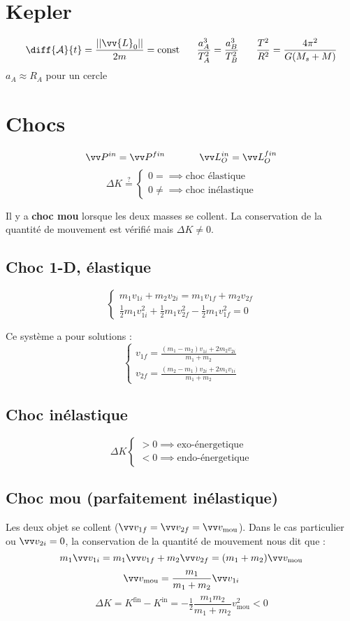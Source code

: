 \documentclass[../main.tex]{subfiles}
\begin{document}
\section{Kepler}
\[
  \diff{\mathcal{A}}{t}=\frac{||\vv{L}_0||}{2m}=\text{const} \phantom{text} \frac{a_A^3}{T_A^2}=\frac{a_B^3}{T_B^2}\phantom{text} \frac{T^2}{R^2}=\frac{4 \pi^2}{G(M_s + M)}
\]
\(a_A\approx R_A\) pour un cercle
\section{Chocs}
\[
  \Qm^{in}=\Qm^{fin} \phantom{texttext}
  \mc^{in}_O=\mc^{fin}_O
\]
\[ \Delta K \overset{?}{=}
  \begin{cases}
    0 = \implies \text{choc élastique}\\
    0 \neq \implies \text{choc inélastique}
  \end{cases}
\]

Il y a \textbf{choc mou} lorsque les deux masses se collent. La conservation de la quantité de mouvement est vérifié mais \(\Delta K \neq 0\).

\subsection{Choc 1-D, élastique}
\[
  \begin{cases}
    m_1 v_{1i} + m_2v_{2i} = m_1 v_{1f} + m_2 v_{2f} \\ 
    \tfrac{1}{2}m_1 v_{1i}^2 + \tfrac{1}{2}m_1 v_{2f}^2 - \tfrac{1}{2}m_1 v_{1f}^2 = 0
  \end{cases}
\]

Ce système a pour solutions :
\[
  \begin{cases}
    v_{1f} = \frac{(m_1-m_2)v_{1i} + 2m_2v_{2i}}{m_1+m_2} \\
    v_{2f} = \frac{(m_2-m_1)v_{2i} + 2m_1v_{1i}}{m_1+m_2}
  \end{cases}
\]

\subsection{Choc inélastique}
\[
  \Delta K 
  \begin{cases}
    > 0 \implies \text{exo-énergetique} \\
    < 0 \implies \text{endo-énergetique}
  \end{cases}
\]

\subsection{Choc mou (parfaitement inélastique)}
Les deux objet se collent (\(\vi_{1f}=\vi_{2f}=\vi_{\text{mou}}\)). Dans le cas particulier ou \(\vi_{2i}=0\), la conservation de la quantité de mouvement nous dit que : 
\[
  m_1\vi_{1i} = m_1\vi_{1f} + m_2\vi_{2f} = (m_1 + m_2)\vi_{\text{mou}} 
\]
\[
  \vi_{\text{mou}} = \frac{m_1}{m_1 + m_2}\vi_{1i}
\]
\[
  \Delta K = K^{\text{fin}} - K^{\text{in}}= -\tfrac{1}{2}\frac{m_1m_2}{m_1+m_2}v_{\text{mou}}^2 < 0 
\]
\end{document}
